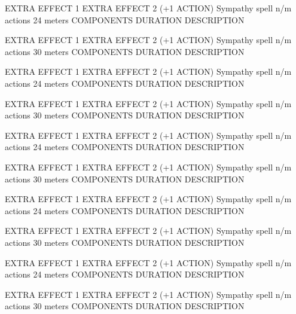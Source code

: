         EXTRA EFFECT 1
        EXTRA EFFECT 2 (+1 ACTION)
        {Sympathy spell}
        {n/m actions}
        {24 meters}
        {COMPONENTS}
        {DURATION}
        DESCRIPTION

        EXTRA EFFECT 1
        EXTRA EFFECT 2 (+1 ACTION)
        {Sympathy spell}
        {n/m actions}
        {30 meters}
        {COMPONENTS}
        {DURATION}
        DESCRIPTION

        EXTRA EFFECT 1
        EXTRA EFFECT 2 (+1 ACTION)
        {Sympathy spell}
        {n/m actions}
        {24 meters}
        {COMPONENTS}
        {DURATION}
        DESCRIPTION

        EXTRA EFFECT 1
        EXTRA EFFECT 2 (+1 ACTION)
        {Sympathy spell}
        {n/m actions}
        {30 meters}
        {COMPONENTS}
        {DURATION}
        DESCRIPTION

        EXTRA EFFECT 1
        EXTRA EFFECT 2 (+1 ACTION)
        {Sympathy spell}
        {n/m actions}
        {24 meters}
        {COMPONENTS}
        {DURATION}
        DESCRIPTION

        EXTRA EFFECT 1
        EXTRA EFFECT 2 (+1 ACTION)
        {Sympathy spell}
        {n/m actions}
        {30 meters}
        {COMPONENTS}
        {DURATION}
        DESCRIPTION

        EXTRA EFFECT 1
        EXTRA EFFECT 2 (+1 ACTION)
        {Sympathy spell}
        {n/m actions}
        {24 meters}
        {COMPONENTS}
        {DURATION}
        DESCRIPTION

        EXTRA EFFECT 1
        EXTRA EFFECT 2 (+1 ACTION)
        {Sympathy spell}
        {n/m actions}
        {30 meters}
        {COMPONENTS}
        {DURATION}
        DESCRIPTION

        EXTRA EFFECT 1
        EXTRA EFFECT 2 (+1 ACTION)
        {Sympathy spell}
        {n/m actions}
        {24 meters}
        {COMPONENTS}
        {DURATION}
        DESCRIPTION

        EXTRA EFFECT 1
        EXTRA EFFECT 2 (+1 ACTION)
        {Sympathy spell}
        {n/m actions}
        {30 meters}
        {COMPONENTS}
        {DURATION}
        DESCRIPTION

